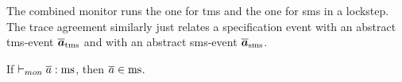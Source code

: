 \documentclass[utf8,acmsmall,review,screen,dvipsnames,anonymous]{acmart}
\begin{document}
\begin{center}
  $\;$\\
\end{center}
The combined monitor runs the one for \gls{tms} and the one for \gls{sms} in a lockstep. The trace agreement similarly just relates a specification event with an abstract \gls{tms}-event $\abstrace[_{\tmssafe}]$ and with an abstract \gls{sms}-event $\abstrace[_{\smssafe}]$.

\begin{lemma}\label{lem:mon:msafe}
  If $\monmssafe{\trace}$, then $\trace\in\mssafe$.\Coqed
\end{lemma}
\end{document}
